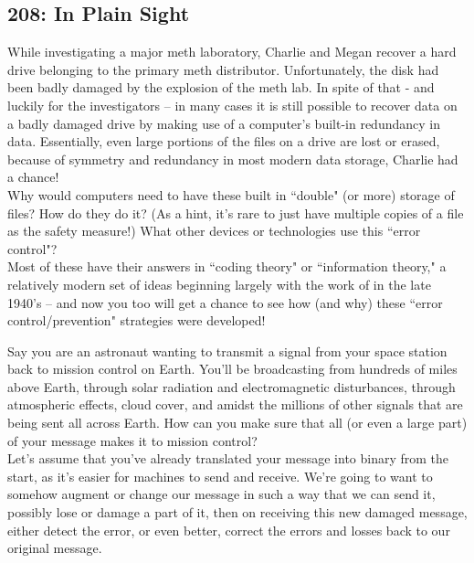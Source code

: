 \newpage
\subsection{208: In Plain Sight}\label{208}

While investigating a major meth laboratory, Charlie and Megan recover a hard drive belonging to the primary meth distributor. Unfortunately, the disk had been badly damaged by the explosion of the meth lab. In spite of that - and luckily for the investigators -- in many cases it is still possible to recover data on a badly damaged drive by making use of a computer's built-in redundancy in data. Essentially, even large portions of the files on a drive are lost or erased, because of symmetry and redundancy in most modern data storage, Charlie had a chance! \\

Why would computers need to have these built in ``double" (or more) storage of files? How do they do it? (As a hint, it's rare to just have multiple copies of a file as the safety measure!) What other devices or technologies use this ``error control"? \\

Most of these have their answers in ``coding theory" or ``information theory," a relatively modern set of ideas beginning largely with the work of  in the late 1940's -- and now you too will get a chance to see how (and why) these ``error control/prevention" strategies were developed! \\


Say you are an astronaut wanting to transmit a signal from your space station back to mission control on Earth. You'll be broadcasting from hundreds of miles above Earth, through solar radiation and electromagnetic disturbances, through atmospheric effects, cloud cover, and amidst the millions of other signals that are being sent all across Earth. How can you make sure that all (or even a large part) of your message makes it to mission control? \\

Let's assume that you've already translated your message into binary from the start, as it's easier for machines to send and receive. We're going to want to somehow augment or change our message in such a way that we can send it, possibly lose or damage a part of it, then on receiving this new damaged message, either detect the error, or even better, correct the errors and losses back to our original message. \\

